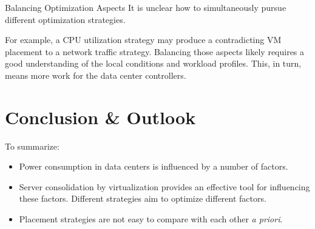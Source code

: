 \documentclass[aspectratio=169]{beamer}
\begin{document}
\begin{frame}{\insertsectionhead}
    \begin{Ldescription}
        \item [Balancing Optimization Aspects]
            It is unclear how to simultaneously pursue different optimization strategies.

            For example, a CPU utilization strategy may produce a contradicting VM placement to a network traffic strategy.
            Balancing those aspects likely requires a good understanding of the local conditions and workload profiles.
            This, in turn, means more work for the data center controllers.
    \end{Ldescription}
\end{frame}

\section{Conclusion \& Outlook}

\begin{frame}{\insertsectionhead}
    To summarize:

    \begin{itemize}
        \item
            Power consumption in data centers is influenced by a number of factors.

        \item
            Server consolidation by virtualization provides an effective tool for influencing these factors.
            Different strategies aim to optimize different factors.

        \item
            Placement strategies are not easy to compare with each other \textit{a priori}.
    \end{itemize}
\end{frame}

\end{document}
